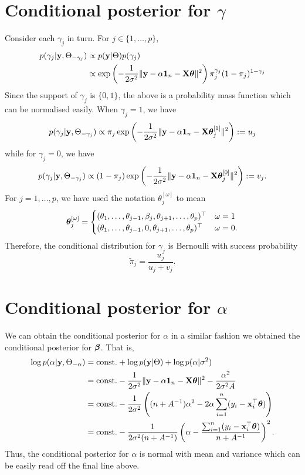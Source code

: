 \section{Conditional posterior for $\gamma$}

Consider each $\gamma_j$ in turn. For $j\in\{1,\dots,p\}$,
\begin{align*}
  p(\gamma_j|{\mathbf y},\Theta_{-\gamma_j}) 
  &\propto p({\mathbf y}|\Theta)p(\gamma_j) \\
  &\propto \exp\left( - \frac{1}{2\sigma^2} \Vert {\mathbf y} - \alpha {\mathbf 1}_n - {\mathbf X}{\bm\theta} \Vert^2 \right)
  \pi_j^{\gamma_j}(1-\pi_j)^{1-\gamma_j}
\end{align*}
Since the support of $\gamma_j$ is $\{0,1\}$, the above is a probability mass function which can be normalised easily.
When $\gamma_j=1$, we have 
\[
  p(\gamma_j|{\mathbf y},\Theta_{-\gamma_j}) 
  \propto \pi_j \exp\left( - \frac{1}{2\sigma^2} \Vert {\mathbf y} - \alpha {\mathbf 1}_n - {\mathbf X}{\bm\theta}_j^{[1]} \Vert^2 \right) := u_j
\]
while for $\gamma_j=0$, we have
\[
  p(\gamma_j|{\mathbf y},\Theta_{-\gamma_j}) \propto (1-\pi_j) \exp\left( - \frac{1}{2\sigma^2} \Vert {\mathbf y} - \alpha {\mathbf 1}_n - {\mathbf X}{\bm\theta}_j^{[0]} \Vert^2 \right) := v_j.
\]
For $j=1,\dots,p$, we have used the notation $\theta_j^{[\omega]}$ to mean
\[
  {\bm\theta}_j^{[\omega]} = 
  \begin{cases}
    (\theta_1,\dots,\theta_{j-1},\beta_j,\theta_{j+1},\dots,\theta_p)^\top &\omega = 1 \\
    (\theta_1,\dots,\theta_{j-1},0,\theta_{j+1},\dots,\theta_p)^\top &\omega = 0.
  \end{cases}
\]
Therefore, the conditional distribution for $\gamma_j$ is Bernoulli with success probability 
\[
  \tilde \pi_j = \frac{u_j}{u_j + v_j}.
\]

\section{Conditional posterior for $\alpha$}

We can obtain the conditional posterior for $\alpha$ in a similar fashion we obtained the conditional posterior for ${\bm\beta}$. 
That is,
\begin{align*}
  \log p(\alpha|{\mathbf y},\Theta_{-\alpha}) 
  &= \text{const.}\hspace{0.01em} + \log p({\mathbf y}|\Theta) + \log p(\alpha|\sigma^2) \\
  &= \text{const.}\hspace{0.01em} - \frac{1}{2\sigma^2} \Vert {\mathbf y} - \alpha {\mathbf 1}_n - {\mathbf X}{\bm\theta} \Vert^2  
  - \frac{\alpha^2}{2\sigma^2A} \\
  &= \text{const.}\hspace{0.01em} - \frac{1}{2\sigma^2} \left( (n+A^{-1})\alpha^2 - 2\alpha\sum_{i=1}^n(y_i - {\mathbf x}_i^\top{\bm\theta}) \right) \\
  &= \text{const.}\hspace{0.01em} - \frac{1}{2\sigma^2(n+A^{-1})} \left( \alpha - \frac{\sum_{i=1}^n(y_i - {\mathbf x}_i^\top{\bm\theta})}{n+A^{-1}}  \right)^2.
\end{align*}
Thus, the conditional posterior for $\alpha$ is normal with mean and variance which can be easily read off the final line above.

